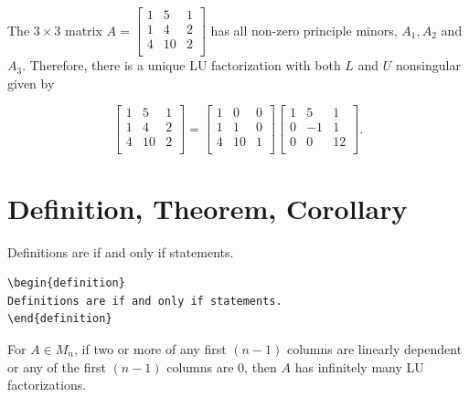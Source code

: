 \begin{example}\normalfont
The $3 \times 3$ matrix  
$A =  \begin{bmatrix}
1 & 5 & 1\\
1 & 4 & 2\\
4 & 10 & 2\\
\end{bmatrix}
$
has all non-zero principle minors, $A_1, A_2$ and $A_3$.  Therefore,  there is a unique LU factorization with both $L$ and $U$ nonsingular given by 
\end{example}
\[
\begin{bmatrix}
1 & 5 & 1\\
1 & 4 & 2\\
4 & 10 & 2\\
\end{bmatrix}
=
\begin{bmatrix}
1 & 0 & 0\\
1 & 1 & 0\\
4 & 10 & 1\\
\end{bmatrix}
\begin{bmatrix}
1 & 5 & 1\\
0 & -1 & 1\\
0 & 0 & 12\\
\end{bmatrix}.
\]



\section*{Definition, Theorem, Corollary}


\begin{definition}
Definitions are if and only if statements.  
\end{definition}

\begin{verbatim}
\begin{definition}
Definitions are if and only if statements.  
\end{definition}
\end{verbatim}

\begin{theorem}
{For $A \in M_n$, if two or more of any first $(n-1)$ columns are linearly dependent or any of the first $(n-1)$ columns are 0, then $A$ has infinitely many LU factorizations.}
\end{theorem}


